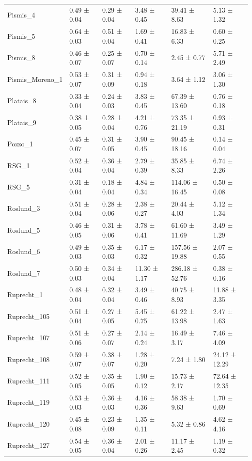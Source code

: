 \begin{tabular}{llllll}
Pismis_4 & 0.49 ± 0.04 & 0.29 ± 0.04 & 3.48 ± 0.45 & 39.41 ± 8.63 & 5.13 ± 1.32 \\
Pismis_5 & 0.64 ± 0.03 & 0.51 ± 0.04 & 1.69 ± 0.41 & 16.83 ± 6.33 & 0.60 ± 0.25 \\
Pismis_8 & 0.46 ± 0.07 & 0.25 ± 0.07 & 0.70 ± 0.14 & 2.45 ± 0.77 & 5.71 ± 2.49 \\
Pismis_Moreno_1 & 0.53 ± 0.07 & 0.31 ± 0.09 & 0.94 ± 0.18 & 3.64 ± 1.12 & 3.06 ± 1.30 \\
Platais_8 & 0.33 ± 0.04 & 0.24 ± 0.03 & 3.83 ± 0.45 & 67.39 ± 13.60 & 0.76 ± 0.18 \\
Platais_9 & 0.38 ± 0.05 & 0.28 ± 0.04 & 4.21 ± 0.76 & 73.35 ± 21.19 & 0.93 ± 0.31 \\
Pozzo_1 & 0.45 ± 0.07 & 0.31 ± 0.05 & 3.90 ± 0.45 & 90.45 ± 18.16 & 0.14 ± 0.04 \\
RSG_1 & 0.52 ± 0.04 & 0.36 ± 0.04 & 2.79 ± 0.39 & 35.85 ± 8.33 & 6.74 ± 2.26 \\
RSG_5 & 0.31 ± 0.04 & 0.18 ± 0.04 & 4.84 ± 0.34 & 114.06 ± 16.45 & 0.50 ± 0.08 \\
Roslund_3 & 0.51 ± 0.04 & 0.28 ± 0.06 & 2.38 ± 0.27 & 20.44 ± 4.03 & 5.12 ± 1.34 \\
Roslund_5 & 0.46 ± 0.05 & 0.31 ± 0.06 & 3.78 ± 0.41 & 61.60 ± 11.69 & 3.49 ± 1.29 \\
Roslund_6 & 0.49 ± 0.03 & 0.35 ± 0.03 & 6.17 ± 0.32 & 157.56 ± 19.88 & 2.07 ± 0.55 \\
Roslund_7 & 0.50 ± 0.03 & 0.34 ± 0.04 & 11.30 ± 1.17 & 286.18 ± 52.76 & 0.38 ± 0.16 \\
Ruprecht_1 & 0.48 ± 0.04 & 0.32 ± 0.04 & 3.49 ± 0.46 & 40.75 ± 8.93 & 11.88 ± 3.35 \\
Ruprecht_105 & 0.51 ± 0.04 & 0.27 ± 0.05 & 5.45 ± 0.75 & 61.22 ± 13.98 & 2.47 ± 1.63 \\
Ruprecht_107 & 0.51 ± 0.06 & 0.27 ± 0.07 & 2.14 ± 0.24 & 16.49 ± 3.17 & 7.46 ± 4.09 \\
Ruprecht_108 & 0.59 ± 0.07 & 0.38 ± 0.07 & 1.28 ± 0.20 & 7.24 ± 1.80 & 24.12 ± 12.29 \\
Ruprecht_111 & 0.52 ± 0.05 & 0.35 ± 0.05 & 1.90 ± 0.12 & 15.73 ± 2.17 & 72.64 ± 12.35 \\
Ruprecht_119 & 0.53 ± 0.03 & 0.36 ± 0.03 & 4.16 ± 0.36 & 58.38 ± 9.63 & 1.70 ± 0.69 \\
Ruprecht_120 & 0.45 ± 0.08 & 0.23 ± 0.09 & 1.35 ± 0.11 & 5.32 ± 0.86 & 4.62 ± 4.16 \\
Ruprecht_127 & 0.54 ± 0.05 & 0.36 ± 0.04 & 2.01 ± 0.26 & 11.17 ± 2.45 & 1.19 ± 0.32 \\

\end{tabular}
